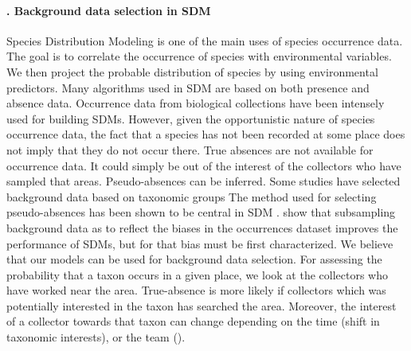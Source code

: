 \paragraph*{\theApplicationCase. Background data selection in SDM}
Species Distribution Modeling is one of the main uses of species occurrence data.
The goal is to correlate the occurrence of species with environmental variables.
We then project the probable distribution of species by using environmental predictors.
%
Many algorithms used in SDM are based on both presence and absence data.
Occurrence data from biological collections have been intensely used for building SDMs.
However, given the opportunistic nature of species occurrence data, the fact that a species has not been recorded at some place does not imply that they do not occur there.
True absences are not available for occurrence data.
It could simply be out of the interest of the collectors who have sampled that areas.
Pseudo-absences can be inferred. 
Some studies have selected background data based on taxonomic groups \cite{}
%
The method used for selecting pseudo-absences has been shown to be central in SDM \cite{Barbet-Massin2012}.
 show that subsampling background data as to reflect the biases in the occurrences dataset improves the performance of SDMs, but for that bias must be first characterized.
We believe that our models can be used for background data selection.
For assessing the probability that a taxon occurs in a given place, we look at the collectors who have worked near the area.
True-absence is more likely if collectors which was potentially interested in the taxon has searched the area.
Moreover, the interest of a collector towards that taxon can change depending on the time (shift in taxonomic interests), or the team ().


















